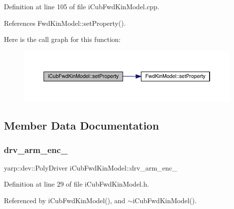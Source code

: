 Definition at line 105 of file i\+Cub\+Fwd\+Kin\+Model.\+cpp.



References Fwd\+Kin\+Model\+::set\+Property().

Here is the call graph for this function\+:
\nopagebreak
\begin{figure}[H]
\begin{center}
\leavevmode
\includegraphics[width=350pt]{classiCubFwdKinModel_a2daa3bb3b2c458200dc487ac00929260_cgraph}
\end{center}
\end{figure}


\subsection{Member Data Documentation}
\mbox{\label{classiCubFwdKinModel_a3a07f11e9b770e8fc7c03bff05c52927}} 
\subsubsection{\texorpdfstring{drv\+\_\+arm\+\_\+enc\+\_\+}{drv\_arm\_enc\_}}
{\footnotesize\ttfamily yarp\+::dev\+::\+Poly\+Driver i\+Cub\+Fwd\+Kin\+Model\+::drv\+\_\+arm\+\_\+enc\+\_\+\hspace{0.3cm}{\ttfamily [protected]}}



Definition at line 29 of file i\+Cub\+Fwd\+Kin\+Model.\+h.



Referenced by i\+Cub\+Fwd\+Kin\+Model(), and $\sim$i\+Cub\+Fwd\+Kin\+Model().

\mbox{\label{classiCubFwdKinModel_af0ca571291c508a2a058c1ff802e6421}} 
